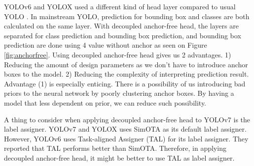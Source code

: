   YOLOv6 and YOLOX used a different kind of head layer compared to usual YOLO \parencites{yolox}{yolov6}. 
  In mainstream YOLO, prediction for bounding box and classes are both calculated on the same layer.
  With decoupled anchor-free head, the layers are separated for class prediction and bounding box prediction, and
  bounding box prediction are done using 4 value without anchor as seen on Figure \ref{fig:anchorfree}. 
  Using decoupled anchor-free head gives us 2 advantages. 1) Reducing the amount of design parameters as 
  we don't have to introduce anchor boxes to the model. 2) Reducing the complexity of interpreting prediction
  result. Advantage (1) is especially enticing. There is a possibility of us introducing bad priors to the neural
  network by poorly clustering anchor boxes. By having a model that less dependent on prior, we can reduce such possibility.

  A thing to consider when applying decoupled anchor-free head to YOLOv7 is the label assigner. YOLOv7 and YOLOX uses SimOTA as its default
  label assigner. However, \textcite{yolov6} YOLOv6 uses Task-aligned Assigner (TAL) for its label assigner. They reported that TAL performs
  better than SimOTA. Therefore, in applying decoupled anchor-free head, it might be better to use TAL as label assigner.

